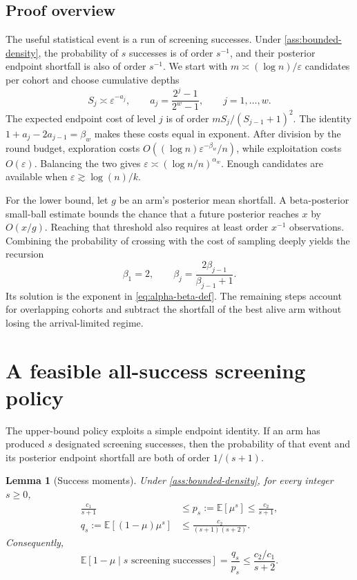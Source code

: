 \documentclass[11pt,letterpaper]{article}
\numberwithin{equation}{section}
\newtheorem{lemma}[lemma]{Lemma}
\theoremstyle{definition}
\theoremstyle{remark}
\newcommand{\E}{\mathbb{E}}
\newcommand{\1}{\mathbf{1}}
\newcommand{\eps}{\varepsilon}
\begin{document}
\subsection{Proof overview}

The useful statistical event is a run of screening successes.
Under \cref{ass:bounded-density}, the probability of $s$ successes is
of order $s^{-1}$, and their posterior endpoint shortfall is also
of order $s^{-1}$. We start with
$m\asymp(\log n)/\eps$ candidates per cohort and choose cumulative depths
\[
  S_j\asymp\eps^{-a_j},
  \qquad
  a_j=\frac{2^j-1}{2^w-1},
  \qquad j=1,\ldots,w.
\]
The expected endpoint cost of level $j$ is of order
$mS_j/(S_{j-1}+1)^2$. The identity
$1+a_j-2a_{j-1}=\beta_w$ makes these costs equal in exponent.
After division by the round budget, exploration costs
$O((\log n)\eps^{-\beta_w}/n)$, while exploitation costs
$O(\eps)$. Balancing the two gives
$\eps\asymp(\log n/n)^{\alpha_w}$. Enough candidates are available
when $\eps\gtrsim\log(n)/k$.

For the lower bound, let $g$ be an arm's posterior mean shortfall.
A beta-posterior small-ball estimate bounds the chance that a future
posterior reaches $x$ by $O(x/g)$. Reaching that threshold also requires
at least order $x^{-1}$ observations. Combining the probability of
crossing with the cost of sampling deeply yields the recursion
\[
  \beta_1=2,
  \qquad
  \beta_j=\frac{2\beta_{j-1}}{\beta_{j-1}+1}.
\]
Its solution is the exponent in \cref{eq:alpha-beta-def}.
The remaining steps account for overlapping cohorts and subtract the
shortfall of the best alive arm without losing the arrival-limited regime.

\section{A feasible all-success screening policy}\label{sec:upper}

The upper-bound policy exploits a simple endpoint identity.  If an arm has
produced $s$ designated screening successes, then the probability of that
event and its posterior endpoint shortfall are both of order $1/(s+1)$.

\begin{lemma}[Success moments]\label{lem:success-moments}
Under \cref{ass:bounded-density}, for every integer $s\ge0$,
\begin{align}
  \frac{c_1}{s+1}
  &\le p_s:=\E[\mu^s]
  \le \frac{c_2}{s+1},                                    \label{eq:ps}\\
  q_s:=\E[(1-\mu)\mu^s]
  &\le \frac{c_2}{(s+1)(s+2)}.                            \label{eq:qs}
\end{align}
Consequently,
\begin{equation}\label{eq:posterior-success-mean}
  \E[1-\mu\mid s\text{ screening successes}]
  =\frac{q_s}{p_s}
  \le \frac{c_2/c_1}{s+2}.
\end{equation}
\end{lemma}
\end{document}
